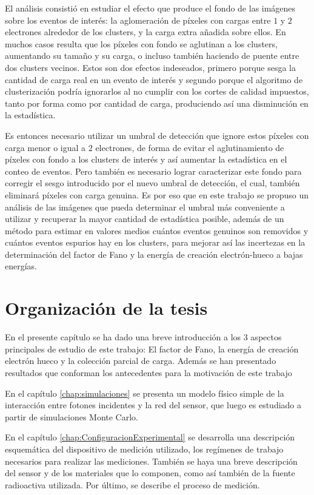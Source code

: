 El análisis consistió en estudiar el efecto que produce el fondo de las imágenes sobre los eventos de interés: la aglomeración de píxeles con cargas entre $1$ y $2$ electrones alrededor de los clusters, y la carga extra añadida sobre ellos. En muchos casos resulta que los píxeles con fondo se aglutinan a los clusters, aumentando su tamaño y su carga, o incluso también haciendo de puente entre dos clusters vecinos. Estos son dos efectos indeseados, primero porque sesga la cantidad de carga real en un evento de interés y segundo porque el algoritmo de clusterización podría ignorarlos al no cumplir con los cortes de calidad impuestos, tanto por forma como por cantidad de carga, produciendo así una disminución en la estadística.

Es entonces necesario utilizar un umbral de detección que ignore estos píxeles con carga menor o igual a $2$ electrones, de forma de evitar el aglutinamiento de píxeles con fondo a los clusters de interés y así aumentar la estadística en el conteo de eventos. Pero también es necesario lograr caracterizar este fondo para corregir el sesgo introducido por el nuevo umbral de detección, el cual, también eliminará píxeles con carga genuina. Es por eso que en este trabajo se propuso un análisis de las imágenes que pueda determinar el umbral más conveniente a utilizar y recuperar la mayor cantidad de estadística posible, además de un método para estimar en valores medios cuántos eventos genuinos son removidos y cuántos eventos espurios hay en los clusters, para mejorar así las incertezas en la determinación del factor de Fano y la energía de creación electrón-hueco a bajas energías.
\section{Organización de la tesis}
\noindent En el presente capítulo se ha dado una breve introducción a los 3 aspectos principales de estudio de este trabajo: El factor de Fano, la energía de creación electrón hueco y la colección parcial de carga. Además se han presentado resultados que conforman los antecedentes para la motivación de este trabajo

En el capítulo \ref{chap:simulaciones} se presenta un modelo físico simple de la interacción entre fotones incidentes y la red del sensor, que luego es estudiado a partir de simulaciones Monte Carlo.

En el capítulo \ref{chap:ConfiguracionExperimental} se desarrolla una descripción esquemática del dispositivo de medición utilizado, los regímenes de trabajo necesarios para realizar las mediciones. También se haya una breve descripción del sensor y de los materiales que lo componen, como así también de la fuente radioactiva utilizada. Por último, se describe el proceso de medición.

